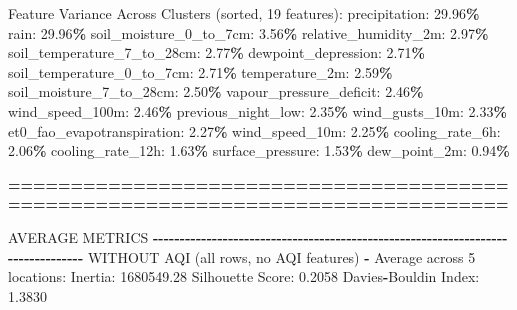 \documentclass[
  letterpaper,
  DIV=11,
  numbers=noendperiod]{scrartcl}
\newenvironment{Shaded}{\begin{snugshade}}{\end{snugshade}}
\newcommand{\BuiltInTok}[1]{#1}
\newcommand{\DecValTok}[1]{\textcolor[rgb]{0.00,0.00,0.81}{#1}}
\newcommand{\FloatTok}[1]{\textcolor[rgb]{0.00,0.00,0.81}{#1}}
\newcommand{\NormalTok}[1]{#1}
\newcommand{\OperatorTok}[1]{\textcolor[rgb]{0.81,0.36,0.00}{\textbf{#1}}}
\begin{document}
\begin{Shaded}
\begin{Highlighting}[]
\NormalTok{  Feature Variance Across Clusters (}\BuiltInTok{sorted}\NormalTok{, }\DecValTok{19}\NormalTok{ features):}
\NormalTok{    precipitation: }\FloatTok{29.96}\OperatorTok{\%}
\NormalTok{    rain: }\FloatTok{29.96}\OperatorTok{\%}
\NormalTok{    soil\_moisture\_0\_to\_7cm: }\FloatTok{3.56}\OperatorTok{\%}
\NormalTok{    relative\_humidity\_2m: }\FloatTok{2.97}\OperatorTok{\%}
\NormalTok{    soil\_temperature\_7\_to\_28cm: }\FloatTok{2.77}\OperatorTok{\%}
\NormalTok{    dewpoint\_depression: }\FloatTok{2.71}\OperatorTok{\%}
\NormalTok{    soil\_temperature\_0\_to\_7cm: }\FloatTok{2.71}\OperatorTok{\%}
\NormalTok{    temperature\_2m: }\FloatTok{2.59}\OperatorTok{\%}
\NormalTok{    soil\_moisture\_7\_to\_28cm: }\FloatTok{2.50}\OperatorTok{\%}
\NormalTok{    vapour\_pressure\_deficit: }\FloatTok{2.46}\OperatorTok{\%}
\NormalTok{    wind\_speed\_100m: }\FloatTok{2.46}\OperatorTok{\%}
\NormalTok{    previous\_night\_low: }\FloatTok{2.35}\OperatorTok{\%}
\NormalTok{    wind\_gusts\_10m: }\FloatTok{2.33}\OperatorTok{\%}
\NormalTok{    et0\_fao\_evapotranspiration: }\FloatTok{2.27}\OperatorTok{\%}
\NormalTok{    wind\_speed\_10m: }\FloatTok{2.25}\OperatorTok{\%}
\NormalTok{    cooling\_rate\_6h: }\FloatTok{2.06}\OperatorTok{\%}
\NormalTok{    cooling\_rate\_12h: }\FloatTok{1.63}\OperatorTok{\%}
\NormalTok{    surface\_pressure: }\FloatTok{1.53}\OperatorTok{\%}
\NormalTok{    dew\_point\_2m: }\FloatTok{0.94}\OperatorTok{\%}

\OperatorTok{================================================================================}

\NormalTok{AVERAGE METRICS}
\OperatorTok{{-}{-}{-}{-}{-}{-}{-}{-}{-}{-}{-}{-}{-}{-}{-}{-}{-}{-}{-}{-}{-}{-}{-}{-}{-}{-}{-}{-}{-}{-}{-}{-}{-}{-}{-}{-}{-}{-}{-}{-}{-}{-}{-}{-}{-}{-}{-}{-}{-}{-}{-}{-}{-}{-}{-}{-}{-}{-}{-}{-}{-}{-}{-}{-}{-}{-}{-}{-}{-}{-}{-}{-}{-}{-}{-}{-}{-}{-}{-}{-}}
\NormalTok{WITHOUT AQI (}\BuiltInTok{all}\NormalTok{ rows, no AQI features) }\OperatorTok{{-}}\NormalTok{ Average across }\DecValTok{5}\NormalTok{ locations:}
\NormalTok{  Inertia: }\FloatTok{1680549.28}
\NormalTok{  Silhouette Score: }\FloatTok{0.2058}
\NormalTok{  Davies}\OperatorTok{{-}}\NormalTok{Bouldin Index: }\FloatTok{1.3830}


\end{Highlighting}
\end{Shaded}
\end{document}
